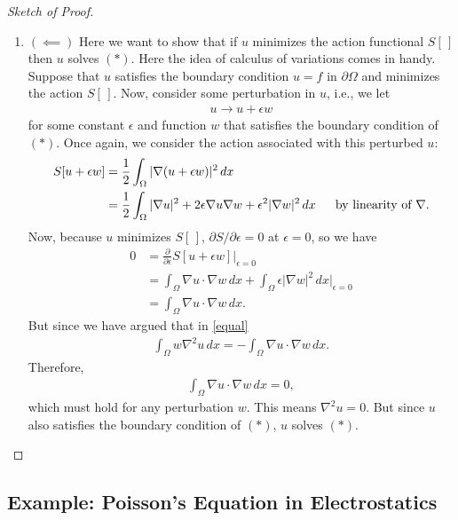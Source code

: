 \documentclass{article}
\newcommand{\p}{\partial}
\newcommand{\f}[2]{\frac{#1}{#2}}
\begin{document}
\begin{proof}[Sketch of Proof]
\begin{enumerate}
		   
		\item $(\impliedby)$ Here we want to show that if $u$ minimizes the action functional $S[\,]$ then $u$ solves $(\ast)$. Here the idea of calculus of variations comes in handy. Suppose that $u$ satisfies the boundary condition $u=f$ in $\p\Omega$ and minimizes the action $S[\,]$. Now, consider some perturbation in $u$, i.e., we let
		\begin{align}
		u \to u + \epsilon w
		\end{align}
		for some constant $\epsilon$ and function $w$ that satisfies the boundary condition of $(\ast)$. Once again, we consider the action associated with this perturbed $u$:
		\begin{align}
		S[u + \epsilon w] &= \frac{1}{2}\int_\Omega \vert \nabla (u + \epsilon w)\vert^2\,dx \nonumber\\
		&= \f{1}{2}\int_\Omega \vert \nabla u \vert^2 + 2\epsilon \nabla u \nabla w + \epsilon^2\vert \nabla w \vert^2\,dx\,\hspace{0.5cm}\text{by linearity of $\nabla$}.
		\end{align} 
		Now, because $u$ minimizes $S[\,]$, ${\p S}/{\p \epsilon} = 0 $ at $\epsilon = 0$, so we have
		\begin{align}
		0 
		&= \f{\p}{\p \epsilon}S[u+\epsilon w]\bigg\vert_{\epsilon =0}\nonumber\\
		&= \int_\Omega \nabla u \cdot \nabla w \,dx + \int_\Omega \epsilon \vert \nabla w \vert^2\,dx \bigg\vert_{\epsilon=0}\nonumber\\
		&= \int_{\Omega}\nabla u \cdot \nabla w\,dx.
		\end{align}
		But since we have argued that in \eqref{equal}
		\begin{align}\label{result}
		\int_\Omega w\nabla^2u\,dx = -\int_\Omega \nabla u  \cdot \nabla w\,dx.
		\end{align}
		Therefore,
		\begin{align}
		\int_\Omega \nabla u\cdot \nabla w\,dx = 0,
		\end{align}
		which must hold for any perturbation $w$. This means $\nabla^2u = 0$. But since $u$ also satisfies the boundary condition of $(\ast)$, $u$ solves $(\ast)$. 
	\end{enumerate}
\end{proof} 



\subsection{Example: Poisson's Equation in Electrostatics}
\end{document}
